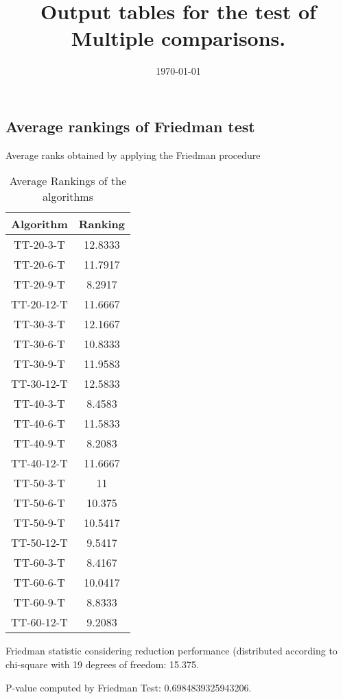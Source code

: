 \documentclass[a4paper,10pt]{article}
\title{Output tables for the test of Multiple comparisons.}
\author{}
\date{\today}
\begin{document}
\begin{landscape}
\pagestyle{empty}
\maketitle
\thispagestyle{empty}
\section{Average rankings of Friedman test}



Average ranks obtained by applying the Friedman procedure

\begin{table}[!htp]
\centering
\begin{tabular}{|c|c|}\hline
Algorithm&Ranking\\\hline
TT-20-3-T & 12.8333\\
TT-20-6-T & 11.7917\\
TT-20-9-T & 8.2917\\
TT-20-12-T & 11.6667\\
TT-30-3-T & 12.1667\\
TT-30-6-T & 10.8333\\
TT-30-9-T & 11.9583\\
TT-30-12-T & 12.5833\\
TT-40-3-T & 8.4583\\
TT-40-6-T & 11.5833\\
TT-40-9-T & 8.2083\\
TT-40-12-T & 11.6667\\
TT-50-3-T & 11\\
TT-50-6-T & 10.375\\
TT-50-9-T & 10.5417\\
TT-50-12-T & 9.5417\\
TT-60-3-T & 8.4167\\
TT-60-6-T & 10.0417\\
TT-60-9-T & 8.8333\\
TT-60-12-T & 9.2083\\
\hline
\end{tabular}
\caption{Average Rankings of the algorithms}
\end{table}

Friedman statistic considering reduction performance (distributed according to chi-square with 19 degrees of freedom: 15.375.

P-value computed by Friedman Test: 0.6984839325943206.\newline




\end{landscape}
\end{document}

